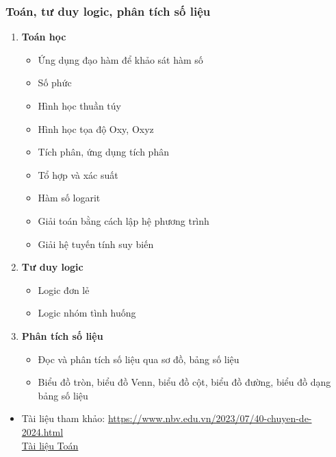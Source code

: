 \subsubsection{Toán, tư duy logic, phân tích số liệu}
\begin{enumerate}
    \item \textbf{Toán học}
    \begin{itemize}
        \item Ứng dụng đạo hàm để khảo sát hàm số
        \item Số phức
        \item Hình học thuần túy
        \item Hình học tọa độ Oxy, Oxyz
        \item Tích phân, ứng dụng tích phân
        \item Tổ hợp và xác suất
        \item Hàm số logarit
        \item Giải toán bằng cách lập hệ phương trình
        \item Giải hệ tuyến tính suy biến
    \end{itemize}
    
    \item \textbf{Tư duy logic}
    \begin{itemize}
        \item Logic đơn lẻ
        \item Logic nhóm tình huống
    \end{itemize}
    \item \textbf{Phân tích số liệu}
    \begin{itemize}
        \item Đọc và phân tích số liệu qua sơ đồ, bảng số liệu
        \item Biểu đồ tròn, biểu đồ Venn, biểu đồ cột, biểu đồ đường, biểu đồ dạng bảng số liệu
    \end{itemize}
\end{enumerate}
\begin{itemize}
    \item Tài liệu tham khảo: \href{https://www.nbv.edu.vn/2023/07/40-chuyen-de-2024.html}{https://www.nbv.edu.vn/2023/07/40-chuyen-de-2024.html} \\ \href{https://drive.google.com/drive/folders/1JBYkj8FNyg_dsuybkv0xJQ3jtTPyyFNL}{Tài liệu Toán}
\end{itemize}
